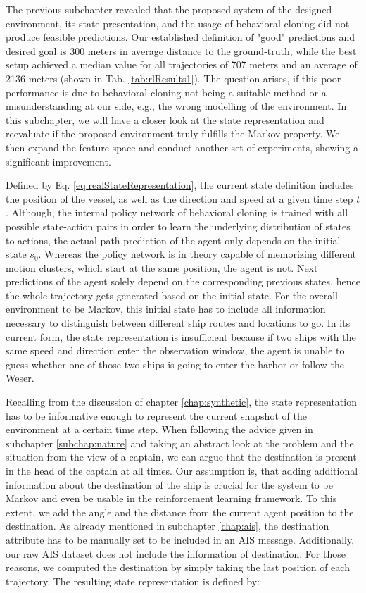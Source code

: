 The previous subchapter revealed that the proposed system of the designed environment, its state presentation, and the usage of behavioral cloning did not produce feasible predictions. Our established definition of "good" predictions and desired goal is 300 meters in average distance to the ground-truth, while the best setup achieved a median value for all trajectories of 707 meters and an average of 2136 meters (shown in Tab. \ref{tab:rlResults1}). The question arises, if this poor performance is due to behavioral cloning not being a suitable method or a misunderstanding at our side, e.g., the wrong modelling of the environment. In this subchapter, we will have a closer look at the state representation and reevaluate if the proposed environment truly fulfills the Markov property. We then expand the feature space and conduct another set of experiments, showing a significant improvement.
\par
Defined by Eq. \ref{eq:realStateRepresentation}, the current state definition includes the position of the vessel, as well as the direction and speed at a given time step $t$. Although, the internal policy network of behavioral cloning is trained with all possible state-action pairs in order to learn the underlying distribution of states to actions, the actual path prediction of the agent only depends on the initial state $s_0$. Whereas the policy network is in theory capable of memorizing different motion clusters, which start at the same position, the agent is not. Next predictions of the agent solely depend on the corresponding previous states, hence the whole trajectory gets generated based on the initial state. For the overall environment to be Markov, this initial state has to include all information necessary to distinguish between different ship routes and locations to go. In its current form, the state representation is insufficient because if two ships with the same speed and direction enter the observation window, the agent is unable to guess whether one of those two ships is going to enter the harbor or follow the Weser.
\par
Recalling from the discussion of chapter \ref{chap:synthetic}, the state representation has to be informative enough to represent the current snapshot of the environment at a certain time step. When following the advice given in subchapter \ref{subchap:nature} and taking an abstract look at the problem and the situation from the view of a captain, we can argue that the destination is present in the head of the captain at all times. Our assumption is, that adding additional information about the destination of the ship is crucial for the system to be Markov and even be usable in the reinforcement learning framework. To this extent, we add the angle and the distance from the current agent position to the destination. As already mentioned in subchapter \ref{chap:ais}, the destination attribute has to be manually set to be included in an AIS message. Additionally, our raw AIS dataset does not include the information of destination. For those reasons, we computed the destination by simply taking the last position of each trajectory. The resulting state representation is defined by:
